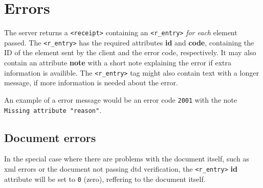 \newpage
\section{Errors}
\label{sec:errors}

The server returns a \texttt{<receipt>} containing an \texttt{<r\_entry>}
\textit{for each} element passed. The \texttt{<r\_entry>} has the required
attributes \textbf{id} and \textbf{code}, containing the ID of the element sent
by the client and the error code, respectively. It may also contain an
attribute \textbf{note} with a short note explaining the error if extra
information is availible. The \texttt{<r\_entry>} tag might also contain text
with a longer message, if more information is needed about the error. 

An example of a error message would be an error code \texttt{2001} with the
note \texttt{Missing attribute "reason"}.

\subsection{Document errors}

In the special case where there are problems with the document itself, such as
\gls{xml} errors or the document not passing \gls{dtd} verification, the
\texttt{<r\_entry>} \textbf{id} attribute will be set to \texttt{0} (zero),
reffering to the document itself. 
